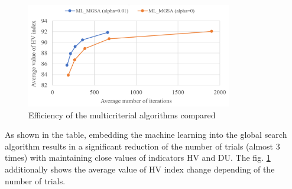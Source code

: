 \documentclass[runningheads]{llncs}
\begin{document}
\begin{figure}[ht]
\center

\includegraphics[width=0.8\textwidth]{fig2.png}
\caption{Efficiency of the multicriterial algorithms compared} \label{fig:2}
\end{figure}

As shown in the table, embedding the machine learning into the global search algorithm results in a significant reduction of the number of trials (almost 3 times) with maintaining close values of indicators HV and DU. The fig. \ref{fig:2} additionally shows the average value of HV index change depending of the number of trials.

%
%
%
% 
% 
%


\end{document}
